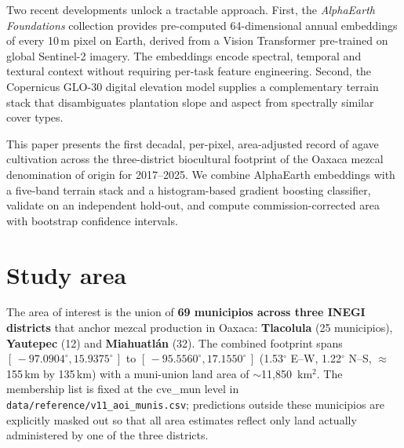 \documentclass[10pt,a4paper]{article}
\begin{document}
Two recent developments unlock a tractable approach. First, the
\textit{AlphaEarth Foundations} collection \citep{google2024alphaearth}
provides pre-computed 64-dimensional annual embeddings of every 10\,m
pixel on Earth, derived from a Vision Transformer pre-trained on global
Sentinel-2 imagery. The embeddings encode spectral, temporal and textural
context without requiring per-task feature engineering. Second, the
Copernicus GLO-30 digital elevation model supplies a complementary
terrain stack that disambiguates plantation slope and aspect from
spectrally similar cover types.

This paper presents the first decadal, per-pixel, area-adjusted record
of agave cultivation across the three-district biocultural footprint of
the Oaxaca mezcal denomination of origin for 2017--2025. We combine
AlphaEarth embeddings with a five-band terrain stack and a
histogram-based gradient boosting classifier, validate on an
independent hold-out, and compute commission-corrected area with
bootstrap confidence intervals.

\section{Study area}\label{sec:study-area}

The area of interest is the union of \textbf{69 municipios across
three INEGI districts} that anchor mezcal production in Oaxaca:
\textbf{Tlacolula} (25 municipios), \textbf{Yautepec} (12) and
\textbf{Miahuatlán} (32). The combined footprint spans
$[\,-97.0904^{\circ}, 15.9375^{\circ}\,]$ to
$[\,-95.5560^{\circ}, 17.1550^{\circ}\,]$ (1.53$^{\circ}$ E--W,
1.22$^{\circ}$ N--S, $\approx$155\,km by 135\,km) with a
muni-union land area of $\sim$11{,}850~km$^2$. The membership list
is fixed at the cve\_mun level in
\texttt{data/reference/v11\_aoi\_munis.csv}; predictions outside
these municipios are explicitly masked out so that all area
estimates reflect only land actually administered by one of the
three districts.
\end{document}
